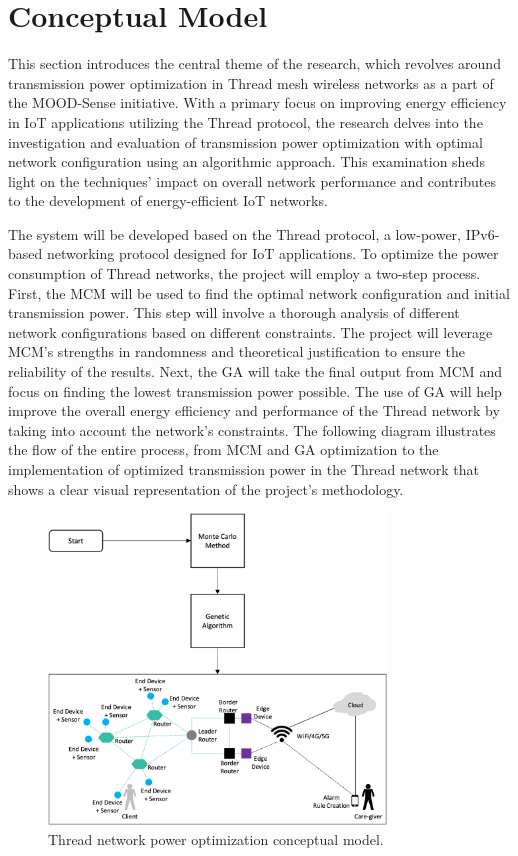 \chapter{Conceptual Model}\label{chap:conceptual_model}

This section introduces the central theme of the research, which revolves around transmission power optimization in Thread mesh wireless networks as a part of the MOOD-Sense initiative. With a primary focus on improving energy efficiency in \gls{IoT} applications utilizing the Thread protocol, the research delves into the investigation and evaluation of transmission power optimization with optimal network configuration using an algorithmic approach. This examination sheds light on the techniques' impact on overall network performance and contributes to the development of energy-efficient \gls{IoT} networks.

The system will be developed based on the Thread protocol, a low-power, \gls{IPv6}-based networking protocol designed for \gls{IoT} applications. To optimize the power consumption of Thread networks, the project will employ a two-step process. First, the \gls{MCM} will be used to find the optimal network configuration and initial transmission power. This step will involve a thorough analysis of different network configurations based on different constraints. The project will leverage \gls{MCM}'s strengths in randomness and theoretical justification to ensure the reliability of the results. Next, the \gls{GA} will take the final output from \gls{MCM} and focus on finding the lowest transmission power possible. The use of \gls{GA} will help improve the overall energy efficiency and performance of the Thread network by taking into account the network's constraints. The following diagram illustrates the flow of the entire process, from \gls{MCM} and \gls{GA} optimization to the implementation of optimized transmission power in the Thread network that shows a clear visual representation of the project's methodology.

\begin{figure}[H]
    \centering
    \includegraphics[width=0.8\textwidth]{images/conceptual_model/Thread_Network_Power_Optimization_Conceptual_Model.png}
    \caption{Thread network power optimization conceptual model.}
    \label{fig:conceptual_model}
\end{figure}

